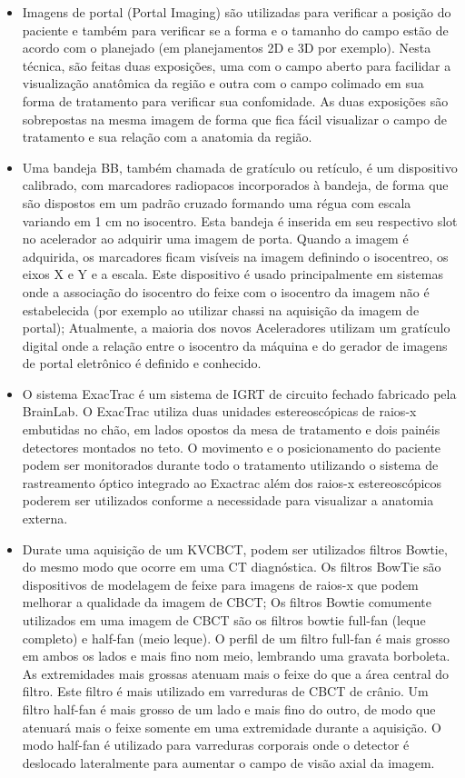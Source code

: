 \documentclass[11pt,a4paper]{article}
\newcounter{exemplo}
\begin{document}
\begin{exemplo}[12. IGRT ]
\begin{itemize}
        \item Imagens de portal (Portal Imaging) são utilizadas para verificar a posição do paciente e também para verificar se a forma e o tamanho do campo estão de acordo com o planejado (em planejamentos 2D e 3D por exemplo). Nesta técnica, são feitas duas exposições, uma com o campo aberto para facilidar a visualização anatômica da região e outra com o campo colimado em sua forma de tratamento para verificar sua confomidade. As duas exposições são sobrepostas na mesma imagem de forma que fica fácil visualizar o campo de tratamento e sua relação com a anatomia da região.
        
        \item Uma bandeja BB, também chamada de gratículo ou retículo, é um dispositivo calibrado, com marcadores radiopacos incorporados à bandeja, de forma que são dispostos em um padrão cruzado formando uma régua com escala variando em 1 cm  no isocentro. Esta bandeja é inserida em seu respectivo slot no acelerador ao adquirir uma imagem de porta. Quando a imagem é adquirida, os marcadores ficam visíveis na imagem definindo o isocentreo, os eixos X e Y e a escala. Este dispositivo é usado principalmente em sistemas onde a associação do isocentro do feixe com o isocentro da imagem não é estabelecida (por exemplo ao utilizar chassi na aquisição da imagem de portal); Atualmente, a maioria dos novos Aceleradores utilizam um gratículo digital onde a relação entre o isocentro da máquina e do gerador de imagens de portal eletrônico é definido e conhecido.
        
        \item O sistema ExacTrac é um sistema de IGRT de circuito fechado fabricado pela BrainLab. O ExacTrac utiliza duas unidades estereoscópicas de raios-x embutidas no chão, em lados opostos da mesa de tratamento e dois painéis detectores montados no teto. O movimento e o posicionamento do paciente podem ser monitorados durante todo o tratamento utilizando o sistema de rastreamento óptico integrado ao Exactrac além dos raios-x estereoscópicos poderem ser utilizados conforme a necessidade para visualizar a anatomia externa.
        
        \item Durate uma aquisição de um KVCBCT, podem ser utilizados filtros Bowtie, do mesmo modo que ocorre em uma CT diagnóstica. Os filtros BowTie são dispositivos de modelagem de feixe para imagens de raios-x que podem melhorar a qualidade da imagem de CBCT; Os filtros Bowtie comumente utilizados em uma imagem de CBCT são os filtros bowtie full-fan (leque completo) e half-fan (meio leque). O perfil de um filtro full-fan é mais grosso em ambos os lados e mais fino nom meio, lembrando uma gravata borboleta. As extremidades mais grossas atenuam mais o feixe do que a área central do filtro. Este filtro é mais utilizado em varreduras de CBCT de crânio. Um filtro half-fan é mais grosso de um lado e mais fino do outro, de modo que atenuará mais o feixe somente em uma extremidade durante a aquisição. O modo half-fan é utilizado para varreduras corporais onde o detector é deslocado lateralmente para aumentar o campo de visão axial da imagem.
        

\end{itemize}
\end{exemplo}
\end{document}
